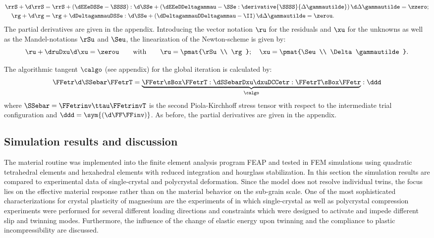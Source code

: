   \begin{align}
    \rrS + \d \rrS &= \rrS + \left(\dEEeDSSe-\SSSS\right):\d \SSe + \left(\dEEeDDeltagammau-\SSe:\derivative{\SSSS}{\Delta\gammautilde} \right)\d \Delta \gammautilde \label{eq:rrS} = \zzero; \\ %
    \rg + \d \rg &= \rg + \dDeltagammauDSSe:\d \SSe + \left( \dDeltagammauDDeltagammau - \II \right) \d \Delta \gammautilde = \zerou \label{eq:rg}.
  \end{align}
  The partial derivatives are given in the appendix. Introducing the vector notation $\ru$ for the residuals and $\xu$ for the unknowns as well as the Mandel-notations $\rSu$ and $\Seu$, the linearization of the Newton-scheme is given by:
  \begin{equation}
    \ru + \druDxu \d\xu = \zerou \qquad \text{with} \qquad \ru = \pmat{\rSu \\ \rg}; \quad \xu = \pmat{\Seu \\ \Delta\gammautilde}.
  \end{equation}

  The algorithmic tangent $\calgo$ (see appendix) for the global iteration is calculated by:
  \begin{align}
    \FFetr \d\SSebar \FFetrT = \underbrace{\FFetr \sBox \FFetrT : \dSSebarDxu \dxuDCCetr : \FFetrT \sBox \FFetr}_{\calgo} : \ddd
    \label{eq:calgo}
  \end{align}
  where $\SSebar=\FFetrinv \ttau \FFetrinvT$ is the second Piola-Kirchhoff stress tensor with respect to the intermediate trial configuration and $\ddd=\sym{(\d\FF\FFinv)}$. As before, the partial derivatives are given in the appendix. \\
 
  \subsection{Simulation results and discussion} %
  The material routine was implemented into the finite element analysis program FEAP\supercite{taylor2014feap} and tested in FEM simulations using quadratic tetrahedral elements and hexahedral elements with reduced integration and hourglass stabilization. In this section the simulation results are compared to experimental data of single-crystal and polycrystal deformation. Since the model does not resolve individual twins, the focus lies on the effective material response rather than on the material behavior on the sub-grain scale. One of the most sophisticated characterizations for crystal plasticity of magnesium are the experiments of  in which single-crystal as well as polycrystal compression experiments were performed for several different loading directions and constraints which were designed to activate and impede different slip and twinning modes. Furthermore, the influence of the change of elastic energy upon twinning and the compliance to plastic incompressibility are discussed.
  
